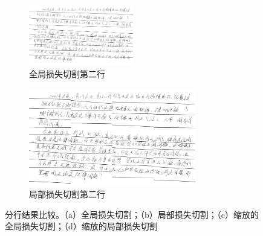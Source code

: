\begin{figure}[ht!]
	
	\begin{subfigure}{.49\textwidth}
		\centering
		\includegraphics[width=0.5\textwidth]{figure/chapter4/line1.png}
		\caption{全局损失切割第二行}
		\label{fig:line3}
	\end{subfigure}
	\begin{subfigure}{.49\textwidth}
		\centering
		\includegraphics[width=0.8\textwidth]{figure/chapter4/line2.png}
		\caption{局部损失切割第二行}
		\label{fig:line4}
	\end{subfigure}
	\caption{分行结果比较。（a）全局损失切割；（b）局部损失切割；（c）缩放的全局损失切割；（d）缩放的局部损失切割}
	\label{fig:multi}
\end{figure}

\newpage %


